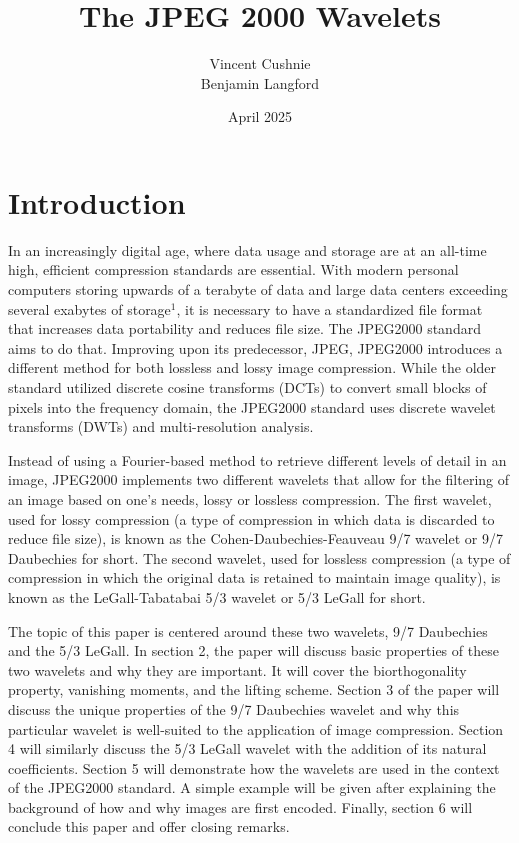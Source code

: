 \documentclass{article}
\title{The JPEG 2000 Wavelets}
\author{Vincent Cushnie \\ Benjamin Langford}
\date{April 2025}
\begin{document}
\maketitle
\clearpage
\section{Introduction}

In an increasingly digital age, where data usage and storage are at an all-time high, efficient compression standards are essential. With modern personal computers storing upwards of a terabyte of data and large data centers exceeding several exabytes of storage$^1$, it is necessary to have a standardized file format that increases data portability and reduces file size. The JPEG2000 standard aims to do that. Improving upon its predecessor, JPEG, JPEG2000 introduces a different method for both lossless and lossy image compression. While the older standard utilized discrete cosine transforms (DCTs) to convert small blocks of pixels into the frequency domain, the JPEG2000 standard uses discrete wavelet transforms (DWTs) and multi-resolution analysis.

Instead of using a Fourier-based method to retrieve different levels of detail in an image, JPEG2000 implements two different wavelets that allow for the filtering of an image based on one's needs, lossy or lossless compression. The first wavelet, used for lossy compression (a type of compression in which data is discarded to reduce file size), is known as the Cohen-Daubechies-Feauveau 9/7 wavelet or 9/7 Daubechies for short. The second wavelet, used for lossless compression (a type of compression in which the original data is retained to maintain image quality), is known as the LeGall-Tabatabai 5/3 wavelet or 5/3 LeGall for short.

The topic of this paper is centered around these two wavelets, 9/7 Daubechies and the 5/3 LeGall. In section 2, the paper will discuss basic properties of these two wavelets and why they are important. It will cover the biorthogonality property, vanishing moments, and the lifting scheme. Section 3 of the paper will discuss the unique properties of the 9/7 Daubechies wavelet and why this particular wavelet is well-suited to the application of image compression. Section 4 will similarly discuss the 5/3 LeGall wavelet with the addition of its natural coefficients. Section 5 will demonstrate how the wavelets are used in the context of the JPEG2000 standard. A simple example will be given after explaining the background of how and why images are first encoded. Finally, section 6 will conclude this paper and offer closing remarks.  
\end{document}
